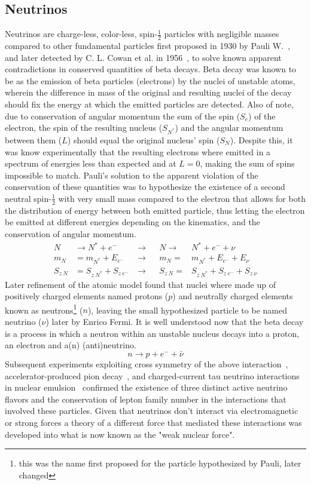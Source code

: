 \subsection{Neutrinos}
Neutrinos are charge-less, color-less, spin-$\frac{1}{2}$ particles with negligible masses compared to other fundamental particles first proposed in 1930 by Pauli W.~\cite{pauli1930neutrino}, and later detected by C. L. Cowan et al. in 1956~\cite{doi:10.1126/science.124.3212.103}, to solve known apparent contradictions in conserved quantities of beta decays. Beta decay was known to be as the emission of beta particles (electrons) by the nuclei of unstable atoms, wherein the difference in mass of the original and resulting nuclei of the decay should fix the energy at which the emitted particles are detected. Also of note, due to conservation of angular momentum the sum of the spin ($S_e$) of the electron, the spin of the resulting nucleus ($S_{N^{*}}$) and the angular momentum between them ($L$) should equal the original nucleus' spin ($S_{N}$). Despite this, it was know experimentally that the resulting electrons where emitted in a spectrum of energies less than expected and at $L=0$, making the sum of spins impossible to match.
Pauli's solution to the apparent violation of the conservation of these quantities was to hypothesize the existence of a second neutral spin-$\frac{1}{2}$ with very small mass compared to the electron that allows for both the distribution of energy between both emitted particle, thus letting the electron be emitted at different energies depending on the kinematics, and the conservation of angular momentum. 
\begin{align*}
  N &\rightarrow N^{*} + e^{-}   ~ &\rightarrow&  &N \rightarrow& N^{*} + e^{-} + \nu \\ \hline
  m_N &= m_{N^*} + E_{e^-}     ~ &\rightarrow&  &m_N =& m_{N^*} + E_{e^-} + E_{\nu} \\
  S_{z~N} &= S_{z~N^*} + S_{z~e^-} ~ &\rightarrow&  &S_{z~N} =& S_{z~N^*} + S_{z~e^-} + S_{z~\nu}
\end{align*}
Later refinement of the atomic model found that nuclei where made up of positively charged elements named protons ($p$) and neutrally charged elements known as neutrons\footnote{this was the name first proposed for the particle hypothesized by Pauli, later changed} ($n$), leaving the small hypothesized particle to be named neutrino ($\nu$) later by Enrico Fermi. It is well understood now that the beta decay is a process in which a neutron within an unstable nucleus decays into a proton, an electron and a(n) (anti)neutrino. 
$$n \rightarrow p + e^{-} + \bar{\nu}$$
Subsequent experiments exploiting cross symmetry of the above interaction~\cite{doi:10.1126/science.124.3212.103}, accelerator-produced pion decay~\cite{Danby1962}, and charged-current tau neutrino interactions in nuclear emulsion~\cite{Kodama2001, Kodama2008} confirmed the existence of three distinct active neutrino flavors and the conservation of lepton family number in the interactions that involved these particles. Given that neutrinos don't interact via electromagnetic or strong forces a theory of a different force that mediated these interactions was developed into what is now known as the "weak nuclear force".
